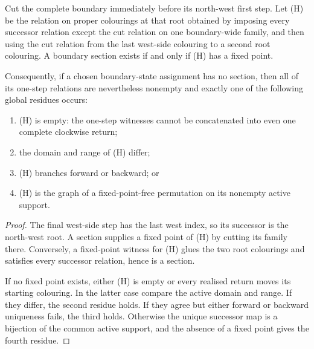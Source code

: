 \begin{corollary}
\label{cor:ordered-mesh-complete-boundary-residue}
Cut the complete boundary immediately before its north-west first step.  Let
(H) be the relation on proper colourings at that root obtained by imposing
every successor relation except the cut relation on one boundary-wide family,
and then using the cut relation from the last west-side colouring to a second
root colouring.  A boundary section exists if and only if (H) has a fixed
point.

Consequently, if a chosen boundary-state assignment has no section, then all
of its one-step relations are nevertheless nonempty and exactly one of the
following global residues occurs:
\begin{enumerate}
\item (H) is empty: the one-step witnesses cannot be concatenated into even
  one complete clockwise return;
\item the domain and range of (H) differ;
\item (H) branches forward or backward; or
\item (H) is the graph of a fixed-point-free permutation on its nonempty
  active support.
\end{enumerate}
\end{corollary}

\begin{proof}
The final west-side step has the last west index, so its successor is the
north-west root.  A section supplies a fixed point of (H) by cutting its
family there.  Conversely, a fixed-point witness for (H) glues the two root
colourings and satisfies every successor relation, hence is a section.

If no fixed point exists, either (H) is empty or every realised return moves
its starting colouring.  In the latter case compare the active domain and
range.  If they differ, the second residue holds.  If they agree but either
forward or backward uniqueness fails, the third holds.  Otherwise the unique
successor map is a bijection of the common active support, and the absence of
a fixed point gives the fourth residue.
\end{proof}

